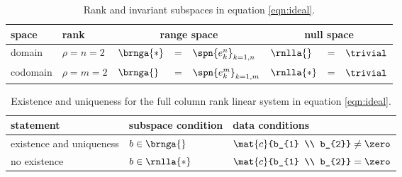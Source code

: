 \begin{table}[htbp]  %
    \caption{Rank and invariant subspaces in equation \eqref{eqn:ideal}.}
    \begin{center}
        \begin{tabular}{lllcllcl}
            space & rank & \multicolumn{3}{c}{range space} & \multicolumn{3}{c}{null space} \\\hline
            domain   & $\rho = n = 2$ & $\brnga{*}$ & = & $\spn{e_{k}^{n}}_{k=1,n}$ & $\rnlla{}$  & = & $\trivial$ \\
            codomain & $\rho = m = 2$ & $\brnga{}$  & = & $\spn{e_{k}^{m}}_{k=1,m}$ & $\rnlla{*}$ & = & $\trivial$ \\
        \end{tabular}
    \end{center}
\end{table}%

    \begin{table}[t]
    	\caption{Existence and uniqueness for the full column rank linear system in equation \eqref{eqn:ideal}.}
    	\begin{center}
    		\begin{tabular}{lll}
    		  statement & subspace condition & data conditions\\\hline
    		  existence and uniqueness & $b\in\brnga{}$ & $\mat{c}{b_{1} \\ b_{2}} \ne \zero$ \\[3pt]
    		  no existence & $b\in\rnlla{*}$ & $\mat{c}{b_{1} \\ b_{2}} = \zero$ \\
    		\end{tabular}
    	\end{center}
    	\label{tab:ftola spaces}
    \end{table}%

\clearpage  %

